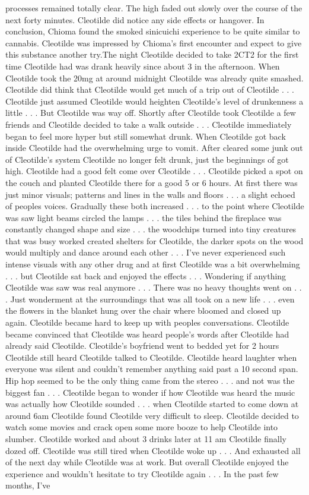 \documentclass[12pt]{book}
\begin{document}
processes remained totally clear. The high faded out slowly over the course of the next forty minutes. Cleotilde did notice any side effects or hangover. In conclusion, Chioma found the smoked sinicuichi experience to be quite similar to cannabis. Cleotilde was impressed by Chioma's first encounter and expect to give this substance another try.The night Cleotilde decided to take 2CT2 for the first time Cleotilde had was drank heavily since about 3 in the afternoon. When Cleotilde took the 20mg at around midnight Cleotilde was already quite smashed. Cleotilde did think that Cleotilde would get much of a trip out of Cleotilde  . . .  Cleotilde just assumed Cleotilde would heighten Cleotilde's level of drunkenness a little  . . .  But Cleotilde was way off. Shortly after Cleotilde took Cleotilde a few friends and Cleotilde decided to take a walk outside  . . .  Cleotilde immediately began to feel more hyper but still somewhat drunk. When Cleotilde got back inside Cleotilde had the overwhelming urge to vomit. After cleared some junk out of Cleotilde's system Cleotilde no longer felt drunk, just the beginnings of got high. Cleotilde had a good felt come over Cleotilde  . . .  Cleotilde picked a spot on the couch and planted Cleotilde there for a good 5 or 6 hours. At first there was just minor visuals; patterns and lines in the walls and floors  . . .  a slight echoed of peoples voices. Gradually these both increased  . . .  to the point where Cleotilde was saw light beams circled the lamps . . .  the tiles behind the fireplace was constantly changed shape and size . . .  the woodchips turned into tiny creatures that was busy worked created shelters for Cleotilde, the darker spots on the wood would multiply and dance around each other  . . .  I've never experienced such intense visuals with any other drug and at first Cleotilde was a bit overwhelming  . . .  but Cleotilde sat back and enjoyed the effects  . . .  Wondering if anything Cleotilde was saw was real anymore  . . .  There was no heavy thoughts went on  . . .  Just wonderment at the surroundings that was all took on a new life  . . .  even the flowers in the blanket hung over the chair where bloomed and closed up again. Cleotilde became hard to keep up with peoples conversations. Cleotilde became convinced that Cleotilde was heard people's words after Cleotilde had already said Cleotilde. Cleotilde's boyfriend went to bedded yet for 2 hours Cleotilde still heard Cleotilde talked to Cleotilde. Cleotilde heard laughter when everyone was silent and couldn't remember anything said past a 10 second span. Hip hop seemed to be the only thing came from the stereo . . .  and not was the biggest fan  . . .  Cleotilde began to wonder if how Cleotilde was heard the music was actually how Cleotilde sounded  . . .  when Cleotilde started to come down at around 6am Cleotilde found Cleotilde very difficult to sleep. Cleotilde decided to watch some movies and crack open some more booze to help Cleotilde into slumber. Cleotilde worked and about 3 drinks later at 11 am Cleotilde finally dozed off. Cleotilde was still tired when Cleotilde woke up  . . .  And exhausted all of the next day while Cleotilde was at work. But overall Cleotilde enjoyed the experience and wouldn't hesitate to try Cleotilde again . . . In the past few months, I've 
\end{document}
